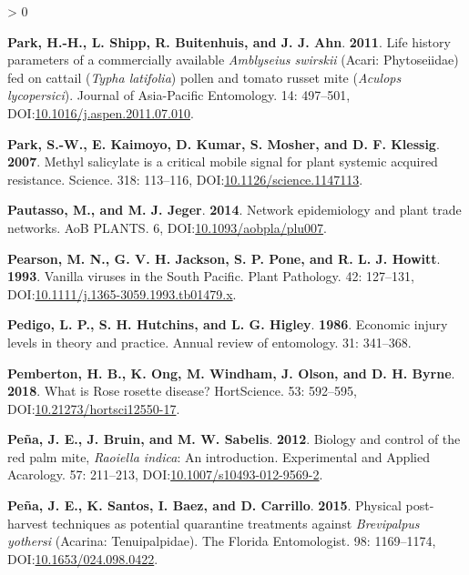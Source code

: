 \documentclass{ufdissertation}[overrideChapters] %
\newlength{\cslhangindent}
\newenvironment{CSLReferences}[2] %
 {%
  \setlength{\parindent}{0pt}
  \ifodd #1 \everypar{\setlength{\hangindent}{\cslhangindent}}\ignorespaces\fi
  \ifnum #2 > 0
  \setlength{\parskip}{#2\baselineskip}
  \fi
 }%
 {}
\begin{document}
{\begin{CSLReferences}{1}{1}
\leavevmode{}%
\textbf{Park, H.-H., L. Shipp, R. Buitenhuis, and J. J. Ahn}. \textbf{2011}. Life history parameters of a commercially available {\emph{Amblyseius swirskii}} ({Acari}: {Phytoseiidae}) fed on cattail ({\emph{Typha latifolia}}) pollen and tomato russet mite ({\emph{Aculops lycopersici}}). Journal of Asia-Pacific Entomology. 14: 497--501, DOI:\href{https://doi.org/10.1016/j.aspen.2011.07.010}{10.1016/j.aspen.2011.07.010}.

\leavevmode{}%
\textbf{Park, S.-W., E. Kaimoyo, D. Kumar, S. Mosher, and D. F. Klessig}. \textbf{2007}. Methyl salicylate is a critical mobile signal for plant systemic acquired resistance. Science. 318: 113--116, DOI:\href{https://doi.org/10.1126/science.1147113}{10.1126/science.1147113}.

\leavevmode{}%
\textbf{Pautasso, M., and M. J. Jeger}. \textbf{2014}. Network epidemiology and plant trade networks. {AoB} {PLANTS}. 6, DOI:\href{https://doi.org/10.1093/aobpla/plu007}{10.1093/aobpla/plu007}.

\leavevmode{}%
\textbf{Pearson, M. N., G. V. H. Jackson, S. P. Pone, and R. L. J. Howitt}. \textbf{1993}. Vanilla viruses in the {South Pacific}. Plant Pathology. 42: 127--131, DOI:\href{https://doi.org/10.1111/j.1365-3059.1993.tb01479.x}{10.1111/j.1365-3059.1993.tb01479.x}.

\leavevmode{}%
\textbf{Pedigo, L. P., S. H. Hutchins, and L. G. Higley}. \textbf{1986}. Economic injury levels in theory and practice. Annual review of entomology. 31: 341--368.

\leavevmode{}%
\textbf{Pemberton, H. B., K. Ong, M. Windham, J. Olson, and D. H. Byrne}. \textbf{2018}. What is {Rose rosette disease}? {HortScience}. 53: 592--595, DOI:\href{https://doi.org/10.21273/hortsci12550-17}{10.21273/hortsci12550-17}.

\leavevmode{}%
\textbf{Peña, J. E., J. Bruin, and M. W. Sabelis}. \textbf{2012}. Biology and control of the red palm mite, {\emph{Raoiella indica}}: An introduction. Experimental and Applied Acarology. 57: 211--213, DOI:\href{https://doi.org/10.1007/s10493-012-9569-2}{10.1007/s10493-012-9569-2}.

\leavevmode{}%
\textbf{Peña, J. E., K. Santos, I. Baez, and D. Carrillo}. \textbf{2015}. Physical post-harvest techniques as potential quarantine treatments against {\emph{Brevipalpus yothersi}} ({Acarina}: {Tenuipalpidae}). The Florida Entomologist. 98: 1169--1174, DOI:\href{https://doi.org/10.1653/024.098.0422}{10.1653/024.098.0422}.


\end{CSLReferences}}
\end{document}
